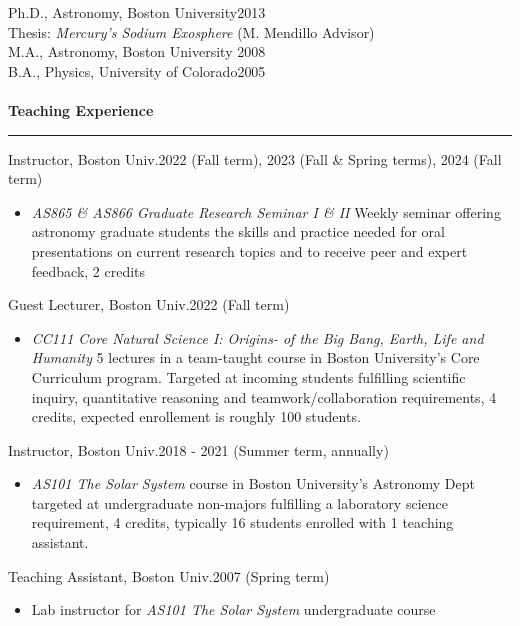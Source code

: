 \documentclass[12pt]{report}
\begin{document}
\noindent Ph.D., Astronomy, Boston University\hfill 2013\\
\indent Thesis: {\it Mercury's Sodium Exosphere} (M. Mendillo Advisor)\\
\noindent M.A., Astronomy, Boston University \hfill 2008\\
\noindent B.A., Physics, University of Colorado\hfill 2005\\
\vspace{2 mm}\\
%
%
\bf{Teaching Experience}\rm \hspace*{\fill} \\
\rule{\textwidth}{1pt}
\noindent Instructor, Boston Univ.\hfill 2022 (Fall term), 2023 (Fall \& Spring terms), 2024 (Fall term)
   \begin{itemize} \itemsep -2pt %
   \item \textit{AS865 \& AS866 Graduate Research Seminar I \& II} Weekly seminar offering astronomy graduate students the skills and practice needed for oral presentations on current research topics and to receive peer and expert feedback, 2 credits
 \end{itemize}
\noindent Guest Lecturer, Boston Univ.\hfill 2022 (Fall term)
   \begin{itemize} \itemsep -2pt %
   \item \textit{CC111 Core Natural Science I: Origins- of the Big Bang, Earth, Life and Humanity} 5 lectures in a team-taught course in Boston University's Core Curriculum program. Targeted at incoming students fulfilling scientific inquiry, quantitative reasoning and teamwork/collaboration requirements, 4 credits, expected enrollement is roughly 100 students.
 \end{itemize}
\noindent Instructor, Boston Univ.\hfill 2018 - 2021 (Summer term, annually)
   \begin{itemize} \itemsep -2pt %
   \item \textit{AS101 The Solar System} course in Boston University's Astronomy Dept targeted at undergraduate
non-majors fulfilling a laboratory science requirement, 4 credits, typically 16 students enrolled with 1 teaching assistant.
 \end{itemize}
\noindent Teaching Assistant, Boston Univ.\hfill 2007 (Spring term)
   \begin{itemize} \itemsep -2pt %
   \item Lab instructor for \textit{AS101 The Solar System} undergraduate course
 \end{itemize}
\end{document}
